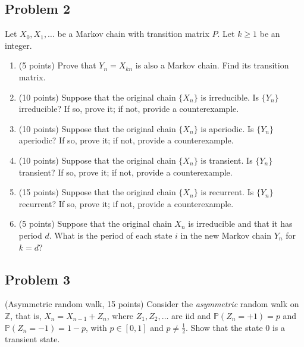 \documentclass{article}
\begin{document}
\subsection*{Problem 2} Let $X_0, X_1, \dots$ be a Markov chain with transition matrix $P$. Let $k \geq 1$ be an integer.
    \begin{enumerate}
        \item (5 points) Prove that $Y_n = X_{kn}$ is also a Markov chain. Find its transition matrix.

            \textcolor{blue}{}

        
        \item (10 points) Suppose that the original chain $\{X_n\}$ is irreducible. Is $\{Y_n\}$ irreducible? If so, prove it; if not, provide a counterexample.

            \textcolor{blue}{}

        
        \item (10 points) Suppose that the original chain $\{X_n\}$ is aperiodic. Is $\{Y_n\}$ aperiodic? If so, prove it; if not, provide a counterexample.

            \textcolor{blue}{}
        
        \item (10 points) Suppose that the original chain $\{X_n\}$ is transient. Is $\{Y_n\}$ transient? If so, prove it; if not, provide a counterexample.

            \textcolor{blue}{}

        
        \item (15 points) Suppose that the original chain $\{X_n\}$ is recurrent. Is $\{Y_n\}$ recurrent? If so, prove it; if not, provide a counterexample.

            \textcolor{blue}{}

        
        \item (5 points) Suppose that the original chain $X_n$ is irreducible and that it has period $d$. What is the period of each state $i$ in the new Markov chain $Y_n$ for $k = d$?

           \textcolor{blue}{}

    \end{enumerate}

\subsection*{Problem 3} (Asymmetric random walk, 15 points) Consider the \textit{asymmetric} random walk on $\mathbb{Z}$, that is, $X_n = X_{n-1} + Z_n$, where $Z_1, Z_2, \dots$ are iid and $\mathbb{P}(Z_n = +1) = p$ and $\mathbb{P}(Z_n = -1) = 1 - p$, with $p \in [0,1]$ and $p \neq \frac{1}{2}$. Show that the state 0 is a transient state.
\end{document}
